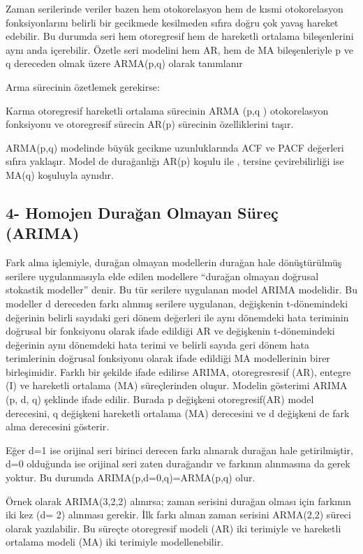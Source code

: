 \documentclass[11pt]{article}
\begin{document}
Zaman serilerinde veriler bazen hem otokorelasyon hem de kısmi
otokorelasyon fonksiyonlarını belirli bir gecikmede kesilmeden sıfıra
doğru çok yavaş hareket edebilir. Bu durumda seri hem otoregresif hem de
hareketli ortalama bileşenlerini aynı anda içerebilir. Özetle seri
modelini hem AR, hem de MA bileşenleriyle p ve q dereceden olmak üzere
ARMA(p,q) olarak tanımlanır

Arma sürecinin özetlemek gerekirse:

Karma otoregresif hareketli ortalama sürecinin ARMA (p,q ) otokorelasyon
fonksiyonu ve otoregresif sürecin AR(p) sürecinin özelliklerini taşır.

ARMA(p,q) modelinde büyük gecikme uzunluklarında ACF ve PACF değerleri
sıfıra yaklaşır. Model de durağanlığı AR(p) koşulu ile , tersine
çevirebilirliği ise MA(q) koşuluyla aynıdır.

\subsection{4- Homojen Durağan Olmayan Süreç
(ARIMA)}\label{homojen-duraux11fan-olmayan-suxfcreuxe7-arima}

Fark alma işlemiyle, durağan olmayan modellerin durağan hale
dönüştürülmüş serilere uygulanmasıyla elde edilen modellere ``durağan
olmayan doğrusal stokastik modeller'' denir. Bu tür serilere uygulanan
model ARIMA modelidir. Bu modeller d dereceden farkı alınmış serilere
uygulanan, değişkenin t-dönemindeki değerinin belirli sayıdaki geri
dönem değerleri ile aynı dönemdeki hata teriminin doğrusal bir
fonksiyonu olarak ifade edildiği AR ve değişkenin t-dönemindeki
değerinin aynı dönemdeki hata terimi ve belirli sayıda geri dönem hata
terimlerinin doğrusal fonksiyonu olarak ifade edildiği MA modellerinin
birer birleşimidir. Farklı bir şekilde ifade edilirse ARIMA,
otoregresresif (AR), entegre (I) ve hareketli ortalama (MA)
süreçlerinden oluşur. Modelin gösterimi ARIMA (p, d, q) şeklinde ifade
edilir. Burada p değişkeni otoregresif(AR) model derecesini, q değişkeni
hareketli ortalama (MA) derecesini ve d değişkeni de fark alma
derecesini gösterir.

Eğer d=1 ise orijinal seri birinci derecen farkı alınarak durağan hale
getirilmiştir, d=0 olduğunda ise orijinal seri zaten durağandır ve
farkının alınmasına da gerek yoktur. Bu durumda ARIMA(p,d=0,q)=ARMA(p,q)
olur.

Örnek olarak ARIMA(3,2,2) alınırsa; zaman serisini durağan olması için
farkının iki kez (d= 2) alınması gerekir. İlk farkı alınan zaman
serisini ARMA(2,2) süreci olarak yazılabilir. Bu süreçte otoregresif
modeli (AR) iki terimiyle ve hareketli ortalama modeli (MA) iki
terimiyle modellenebilir.
\pagebreak
\end{document}
